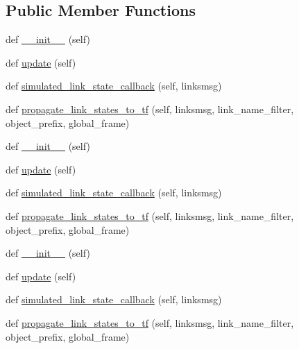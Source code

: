 \subsection*{Public Member Functions}
\begin{DoxyCompactItemize}
\item 
def \hyperlink{classfake__cube__perception__node_1_1FakePerceptionNode_a6f5d90816c2222cf76bd632b5ad46457}{\+\_\+\+\_\+init\+\_\+\+\_\+} (self)
\item 
def \hyperlink{classfake__cube__perception__node_1_1FakePerceptionNode_ae73741e7f84f057cbf109698e70a2515}{update} (self)
\item 
def \hyperlink{classfake__cube__perception__node_1_1FakePerceptionNode_ac1127eae8d2eda994b22873529bd198f}{simulated\+\_\+link\+\_\+state\+\_\+callback} (self, linksmsg)
\item 
def \hyperlink{classfake__cube__perception__node_1_1FakePerceptionNode_aeac788f768e625ecbe445c6af105d3f8}{propagate\+\_\+link\+\_\+states\+\_\+to\+\_\+tf} (self, linksmsg, link\+\_\+name\+\_\+filter, object\+\_\+prefix, global\+\_\+frame)
\item 
def \hyperlink{classfake__cube__perception__node_1_1FakePerceptionNode_a6f5d90816c2222cf76bd632b5ad46457}{\+\_\+\+\_\+init\+\_\+\+\_\+} (self)
\item 
def \hyperlink{classfake__cube__perception__node_1_1FakePerceptionNode_ae73741e7f84f057cbf109698e70a2515}{update} (self)
\item 
def \hyperlink{classfake__cube__perception__node_1_1FakePerceptionNode_ac1127eae8d2eda994b22873529bd198f}{simulated\+\_\+link\+\_\+state\+\_\+callback} (self, linksmsg)
\item 
def \hyperlink{classfake__cube__perception__node_1_1FakePerceptionNode_aeac788f768e625ecbe445c6af105d3f8}{propagate\+\_\+link\+\_\+states\+\_\+to\+\_\+tf} (self, linksmsg, link\+\_\+name\+\_\+filter, object\+\_\+prefix, global\+\_\+frame)
\item 
def \hyperlink{classfake__cube__perception__node_1_1FakePerceptionNode_a6f5d90816c2222cf76bd632b5ad46457}{\+\_\+\+\_\+init\+\_\+\+\_\+} (self)
\item 
def \hyperlink{classfake__cube__perception__node_1_1FakePerceptionNode_ae73741e7f84f057cbf109698e70a2515}{update} (self)
\item 
def \hyperlink{classfake__cube__perception__node_1_1FakePerceptionNode_ac1127eae8d2eda994b22873529bd198f}{simulated\+\_\+link\+\_\+state\+\_\+callback} (self, linksmsg)
\item 
def \hyperlink{classfake__cube__perception__node_1_1FakePerceptionNode_aeac788f768e625ecbe445c6af105d3f8}{propagate\+\_\+link\+\_\+states\+\_\+to\+\_\+tf} (self, linksmsg, link\+\_\+name\+\_\+filter, object\+\_\+prefix, global\+\_\+frame)
\end{DoxyCompactItemize}
